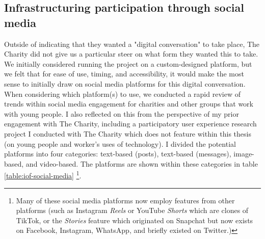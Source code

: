 \subsection{Infrastructuring participation through social media}

Outside of indicating that they wanted a "digital conversation" to take place, The Charity did not give us a particular steer on what form they wanted this to take. We initially considered running the project on a custom-designed platform, but we felt that for ease of use, timing, and accessibility, it would make the most sense to initially draw on social media platforms for this digital conversation. When considering which platform(s) to use,  we conducted a rapid review of trends within social media engagement for charities and other groups that work with young people. I also reflected on this from the perspective of my prior engagement with The Charity, including a participatory user experience research project I conducted with The Charity which does not feature within this thesis (on young people and worker's uses of technology). I divided the potential platforms into four categories: text-based (posts), text-based (messages), image-based, and video-based.  The platforms are shown within these categories in table \ref{table:iof-social-media} \footnote{Many of these social media platforms now employ features from other platforms (such as Instagram \textit{Reels} or YouTube \textit{Shorts} which are clones of TikTok, or the \textit{Stories} feature which originated on Snapchat but now exists on Facebook, Instagram, WhatsApp, and briefly existed on Twitter.)}.

